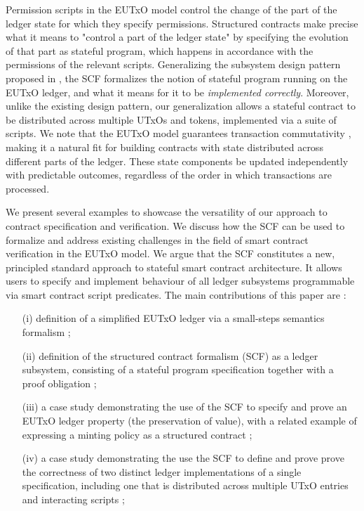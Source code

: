 Permission scripts in the EUTxO model
control the change of the part of the ledger state for which they specify
permissions. Structured contracts make precise what it means to "control a part
of the ledger state" by specifying the evolution of that part as stateful
program, which happens in accordance with the permissions of the relevant scripts.
Generalizing the subsystem design pattern proposed in \cite{eutxoma},
the SCF formalizes the notion of stateful program running on the EUTxO ledger,
and what it means for it to be \emph{implemented correctly}. Moreover, unlike the
existing design pattern,
our generalization allows a stateful contract
to be distributed across multiple UTxOs and tokens, implemented via a suite of scripts.
We note that the EUTxO model guarantees transaction
commutativity \cite{properties}, making it a natural fit for building contracts
with state distributed across different parts of the ledger. These state components
be updated independently with predictable outcomes, regardless of the order in
which transactions are processed.

We present several examples to showcase the versatility of our approach to
contract specification and verification.
We discuss how the SCF can be
used to formalize and address existing challenges in the field of smart contract
verification in the EUTxO model.
We argue that the SCF constitutes a new, principled standard approach to stateful
smart contract architecture. It allows users to specify and implement
behaviour of all ledger subsystems programmable via smart contract script predicates.
The main contributions of this paper are :

\begin{itemize}
  \item[(i)] definition of a simplified EUTxO ledger via a small-steps semantics
  formalism ;

  \item[(ii)] definition of the structured contract formalism (SCF) as a ledger subsystem,
  consisting of a stateful program specification together with a proof obligation  ;

  \item[(iii)] a case study demonstrating the use of the SCF to specify and prove an EUTxO
  ledger property (the preservation of value), with a related example of expressing a minting policy as a
  structured contract ;

  \item[(iv)] a case study demonstrating the use the SCF to define and
  prove prove the correctness of two distinct ledger implementations of a
  single specification, including one that is distributed across multiple
  UTxO entries and interacting scripts ;

\end{itemize}
